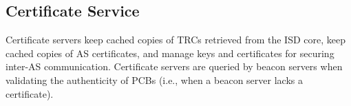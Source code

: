 \subsection{Certificate Service}
Certificate servers keep cached copies of TRCs retrieved from the ISD core, keep cached copies of AS certificates, and manage keys and certificates for securing inter-AS communication. Certificate servers are queried by beacon servers when validating the authenticity of PCBs (i.e., when a beacon server lacks a certificate).